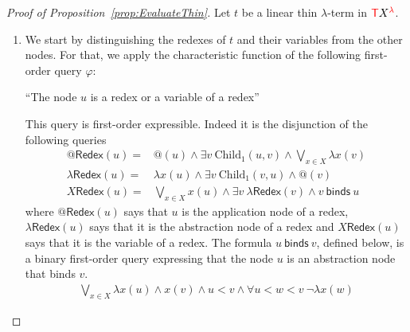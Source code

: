 \begin{proof}[Proof of Proposition~\ref{prop:EvaluateThin}] Let $t$ be a linear thin $\lambda$-term in ${\color{red}{\mathsf T}} {X}^{{\color{red}{\lambda}}}$.




\begin{enumerate}
\item
We start by distinguishing the redexes of $t$ and their variables from the other nodes. For that, we apply the characteristic function of the following first-order query $\varphi$:
    \begin{center}
    ``The node $u$ is a redex or a variable of a redex''
    \end{center}
    This query is first-order expressible. Indeed it is the disjunction of the following queries
$$\begin{array}{rl}
@\mathsf{Redex}(u) = & @(u) \wedge \exists v \ \mathrm{Child}_1(u,v) \wedge \bigvee_{x\in X}\lambda x(v)\\
\lambda\mathsf{Redex}(u)=& \lambda x(u) \wedge \exists v \ \mathrm{Child}_1(v,u) \wedge @(v) \\
X\mathsf{Redex}(u) = &\bigvee_{x\in X} x(u) \wedge \exists v\ \lambda\mathsf{Redex}(v) \wedge v\ \mathsf{binds}\ u
\end{array}$$
where $@\mathsf{Redex}(u)$ says that $u$ is the application node of a redex, $\lambda\mathsf{Redex}(u)$ says that it is the abstraction node of a redex and $X\mathsf{Redex}(u)$ says that it is the variable of a redex. 
The formula $u\ \mathsf{binds}\ v$, defined below,  is a binary first-order query expressing that the node $u$ is an abstraction node that binds $v$.
 \begin{align*}
 \bigvee_{x\in X} \lambda x(u) \wedge x(v) \wedge u<v\wedge \forall u<w<v\ \neg \lambda x(w)
 \end{align*}


\end{enumerate}
\end{proof}
